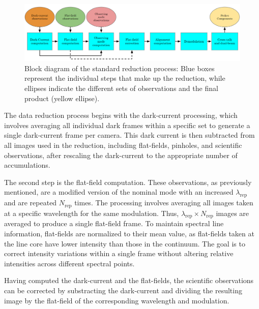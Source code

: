 \begin{figure}[t]
  \includegraphics[width=\textwidth]{figures/Pipeline/pipeline_diagram.PNG}
  \caption{
    Block diagram of the standard reduction process: Blue boxes represent the individual steps that make up the reduction, while ellipses indicate the different sets of observations and the final product (yellow ellipse). }
    \label{fig_pipeline: block_diagram}
\end{figure}

The data reduction process begins with the dark-current processing, which involves averaging all individual dark frames within a specific set to generate a single dark-current frame per camera. This dark current is then subtracted from all images used in the reduction, including flat-fields, pinholes, and scientific observations, after rescaling the dark-current to the appropriate number of accumulations.

The second step is the flat-field computation. These observations, as previously mentioned, are a modified version of the nominal mode with an increased $\lambda_{\text{rep}}$ and are repeated $N_{\text{rep}}$ times. The processing involves averaging all images taken at a specific wavelength for the same modulation. Thus, $\lambda_{\text{rep}} \times N_{\text{rep}}$ images are averaged to produce a single flat-field frame. To maintain spectral line information, flat-fields are normalized to their mean value, as flat-fields taken at the line core have lower intensity than those in the continuum. The goal is to correct intensity variations within a single frame without altering relative intensities across different spectral points.

Having computed the dark-current and the flat-fields, the scientific observations can be corrected by substracting the dark-current and dividing the resulting image by the flat-field of the corresponding wavelength and modulation. 

